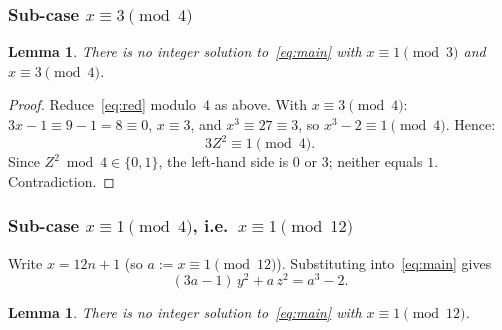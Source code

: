 \documentclass[12pt,a4paper]{article}
\newtheorem{lemma}[theorem]{Lemma}
\theoremstyle{definition}
\begin{document}
\subsubsection{Sub-case \texorpdfstring{$x \equiv 3 \pmod{4}$}{x ≡ 3 (mod 4)}}

\begin{lemma}\label{lem:case1b}
  There is no integer solution to~\eqref{eq:main} with
  $x \equiv 1 \pmod{3}$ and $x \equiv 3 \pmod{4}$.
\end{lemma}

\begin{proof}
  Reduce~\eqref{eq:red} modulo~$4$ as above.
  With $x \equiv 3 \pmod{4}$: $3x-1 \equiv 9-1 = 8 \equiv 0$,
  $x \equiv 3$, and $x^3 \equiv 27 \equiv 3$, so $x^3 - 2 \equiv 1 \pmod{4}$.
  Hence:
  \[
    3Z^2 \equiv 1 \pmod{4}.
  \]
  Since $Z^2 \bmod 4 \in \{0,1\}$, the left-hand side is $0$ or $3$;
  neither equals $1$.  Contradiction.
\end{proof}

\subsubsection{Sub-case \texorpdfstring{$x \equiv 1 \pmod{4}$}{x ≡ 1 (mod 4)},
  i.e.\ \texorpdfstring{$x \equiv 1 \pmod{12}$}{x ≡ 1 (mod 12)}}
\label{sec:case1e}

Write $x = 12n+1$ (so $a := x \equiv 1\pmod{12}$).
Substituting into~\eqref{eq:main} gives
\begin{equation}\label{eq:sub1}
  (3a-1)\,y^2 + a\,z^2 = a^3 - 2.
\end{equation}

\begin{lemma}\label{lem:case1e}
  There is no integer solution to~\eqref{eq:main} with $x \equiv 1 \pmod{12}$.
\end{lemma}
\end{document}
